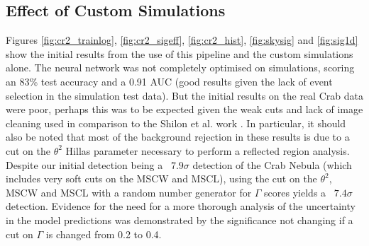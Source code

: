 \subsection{Effect of Custom Simulations}
Figures \ref{fig:cr2_trainlog}, \ref{fig:cr2_sigeff}, \ref{fig:cr2_hist}, \ref{fig:skysig} and \ref{fig:sig1d} show the initial results from the use of this pipeline and the custom simulations alone. The neural network was not completely optimised on simulations, scoring an 83\% test accuracy and a 0.91 AUC (good results given the lack of event selection in the simulation test data). But the initial results on the real Crab data were poor, perhaps this was to be expected given the weak cuts and lack of image cleaning used in comparison to the Shilon et al. work \cite{Shilon}. In particular, it should also be noted that most of the background rejection in these results is due to a cut on the $\theta^2$ Hillas parameter necessary to perform a reflected region analysis. Despite our initial detection being a ~$7.9\sigma$ detection of the Crab Nebula (which includes very soft cuts on the MSCW and MSCL), using the cut on the $\theta^2$, MSCW and MSCL with a random number generator for $\Gamma$ scores yields a ~$7.4\sigma$ detection. Evidence for the need for a more thorough analysis of the  uncertainty in the model predictions was demonstrated by the significance not changing if a cut on $\Gamma$ is changed from 0.2 to 0.4.
\begin{table}[h]
    \centering
    \caption{Anasum output for custom simulations alone run.}
    \label{table:RNG}
\end{table}

